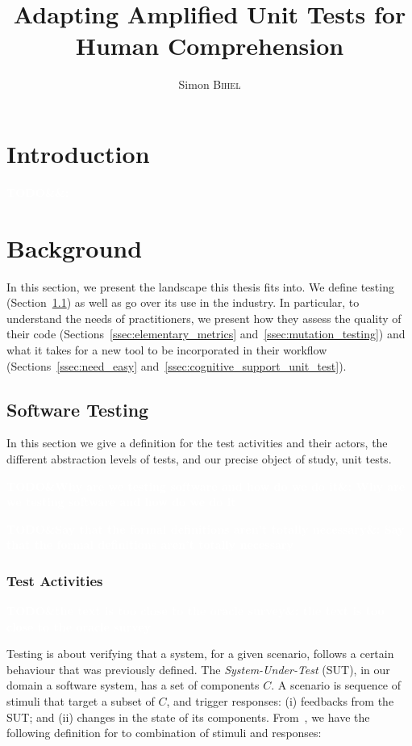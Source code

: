 \documentclass[11pt]{sdm_internship}
\title{Adapting Amplified Unit Tests for Human Comprehension}
\author{Simon \textsc{Bihel}}
\newcommand{\todo}[1]{\colorbox{Red!75}{\textcolor{white}{\textbf{TODO\ifx&#1&\else: #1\fi}}}}
\theoremstyle{definition}
\begin{document}
\maketitle

\section*{Introduction}%
\label{sec:intro}%
\todo{}


\section{Background}%
\label{sec:background}
In this section, we present the landscape this thesis fits into.
We define testing (Section~\ref{ssec:software_testing}) as well as go over its use in the industry.
In particular, to understand the needs of practitioners, we present how they assess the quality of their code (Sections~\ref{ssec:elementary_metrics} and~\ref{ssec:mutation_testing}) and what it takes for a new tool to be incorporated in their workflow (Sections~\ref{ssec:need_easy} and~\ref{ssec:cognitive_support_unit_test}).

\subsection{Software Testing}%
\label{ssec:software_testing}
In this section we give a definition for the test activities and their actors, the different abstraction levels of tests, and our precise object of study, unit tests.

\todo{Why are we testing software and how do we do it}

\todo{Say that the formal definitions aren't totally necessary}

\subsubsection{Test Activities}%
\label{sssec:test_activities}
\todo{the text is too close to the oracle survey}

Testing is about verifying that a system, for a given scenario, follows a certain behaviour that was previously defined.
The \emph{System-Under-Test} (SUT), in our domain a software system, has a set of components $C$.
A scenario is sequence of stimuli that target a subset of $C$, and trigger responses: (i) feedbacks from the SUT\@; and (ii) changes in the state of its components.
From~\cite{barr2015oracle}, we have the following definition for to combination of stimuli and responses:
\end{document}
